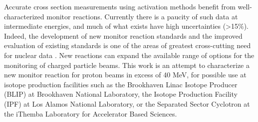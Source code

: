 Accurate cross section measurements using  activation methods benefit from well- characterized monitor reactions.  
Currently there is 
a paucity of such data at intermediate energies, and much of what exists have  high uncertainties (\textgreater15\%).
Indeed, the development of new monitor reaction standards and the improved evaluation of existing standards is one of the areas of greatest cross-cutting need for nuclear data \cite{bernstein2015nuclear}. 
New reactions can expand the available range of options for the monitoring of charged particle beams.
This work 
is an attempt to characterize a new monitor reaction for  proton beams in excess of 40 MeV, for possible use at isotope production facilities such as the  Brookhaven Linac Isotope Producer (BLIP) at Brookhaven National Laboratory, 
the Isotope Production Facility (IPF) at  Los Alamos National Laboratory, or the Separated Sector Cyclotron at the 
iThemba Laboratory for Accelerator Based Sciences.


